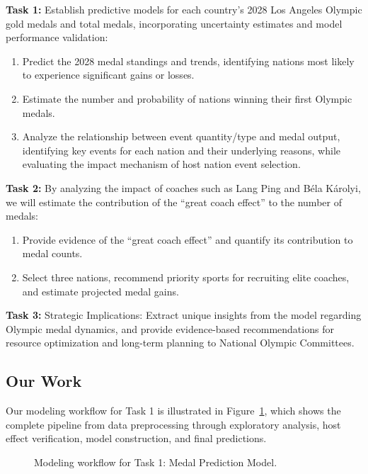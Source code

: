 \documentclass{mcmthesis}
\begin{document}
\textbf{Task 1:} Establish predictive models for each country's 2028 Los Angeles Olympic gold medals and total medals, incorporating uncertainty estimates and model performance validation:
\begin{enumerate}
    \item Predict the 2028 medal standings and trends, identifying nations most likely to experience significant gains or losses.
    \item Estimate the number and probability of nations winning their first Olympic medals.
    \item Analyze the relationship between event quantity/type and medal output, identifying key events for each nation and their underlying reasons, while evaluating the impact mechanism of host nation event selection.
\end{enumerate}

\textbf{Task 2:} By analyzing the impact of coaches such as Lang Ping and B\'{e}la K\'{a}rolyi, we will estimate the contribution of the ``great coach effect'' to the number of medals:
\begin{enumerate}
    \item Provide evidence of the ``great coach effect'' and quantify its contribution to medal counts.
    \item Select three nations, recommend priority sports for recruiting elite coaches, and estimate projected medal gains.
\end{enumerate}

\textbf{Task 3:} Strategic Implications: Extract unique insights from the model regarding Olympic medal dynamics, and provide evidence-based recommendations for resource optimization and long-term planning to National Olympic Committees.

\subsection{Our Work}
Our modeling workflow for Task 1 is illustrated in Figure~\ref{fig:task1_workflow}, which shows the complete pipeline from data preprocessing through exploratory analysis, host effect verification, model construction, and final predictions.

\begin{figure}[htbp]
    \centering
    \caption{Modeling workflow for Task 1: Medal Prediction Model.}
    \label{fig:task1_workflow}
\end{figure}
\end{document}
